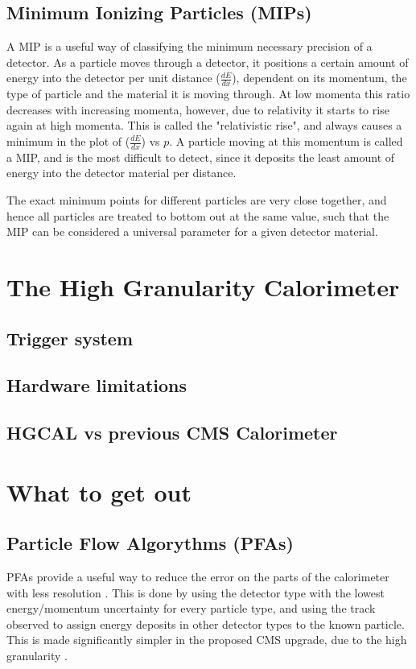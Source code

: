 \documentclass[12 pt]{article}
\begin{document}
		\subsection{Minimum Ionizing Particles (MIPs)}
			A MIP is a useful way of classifying the minimum necessary precision of a detector. As a particle moves through a detector, it positions a certain amount of energy into the detector per unit distance ($\frac{dE}{dx}$), dependent on its momentum, the type of particle and the material it is moving through. At low momenta this ratio decreases with increasing momenta, however, due to relativity it starts to rise again at high momenta. This is called the "relativistic rise", and always causes a minimum in the plot of ($\frac{dE}{dx}$) vs $p$. A particle moving at this momentum is called a MIP, and is the most difficult to detect, since it deposits the least amount of energy into the detector material per distance. 

			The exact minimum points for different particles are very close together, and hence all particles are treated to bottom out at the same value, such that the MIP can be considered a universal parameter for a given detector material. 
	\section{The High Granularity Calorimeter}
		\subsection{Trigger system}
		\subsection{Hardware limitations}
		\subsection{HGCAL vs previous CMS Calorimeter}
	\section{What to get out}
		\subsection{Particle Flow Algorythms (PFAs)}\label{PFAs}
			PFAs provide a useful way to reduce the error on the parts of the calorimeter with less resolution \cite{PFAsInHCAL} \cite{PFAsDualReadout}. This is done by using the detector type with the lowest energy/momentum uncertainty for every particle type, and using the track observed to assign energy deposits in other detector types to the known particle. This is made significantly simpler in the proposed CMS upgrade, due to the high granularity \cite{PFAsInHCAL}.
\end{document}
